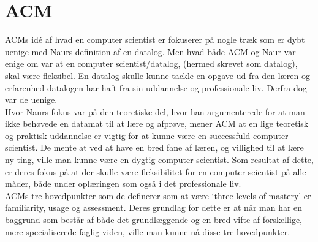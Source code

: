 \section{ACM}
ACMs id\'{e} af hvad en computer scientist er fokuserer på nogle træk som 
er dybt uenige med Naurs definition af en datalog. Men hvad både ACM 
og Naur var enige om var at en computer scientist/datalog, (hermed skrevet som datalog), skal være fleksibel. En datalog skulle kunne tackle en opgave 
ud fra den læren og erfarenhed datalogen har haft fra sin uddannelse og 
professionale liv. Derfra dog var de uenige.\\
Hvor Naurs fokus var på den teoretiske del, hvor han argumenterede for 
at man ikke behøvede en datamat til at lære og afprøve, mener 
ACM at en lige teoretisk og praktisk uddannelse er vigtig for at kunne 
være en successfuld computer scientist. De mente at ved at have en bred fane af læren, og villighed til at lære ny ting, ville man kunne være en dygtig 
computer scientist. Som resultat af dette, er deres fokus på at der skulle 
være fleksibilitet for en computer scientist på alle måder, både under 
oplæringen som også i det professionale liv.\\
ACMs tre hovedpunkter som de definerer som at være `three levels of 
mastery' er familiarity, usage og assessment. Deres grundlag for dette er at 
når man har en baggrund som består af både det grundlæggende og en 
bred vifte af forskellige, mere specialiserede faglig viden, ville man kunne 
nå disse tre hovedpunkter.
